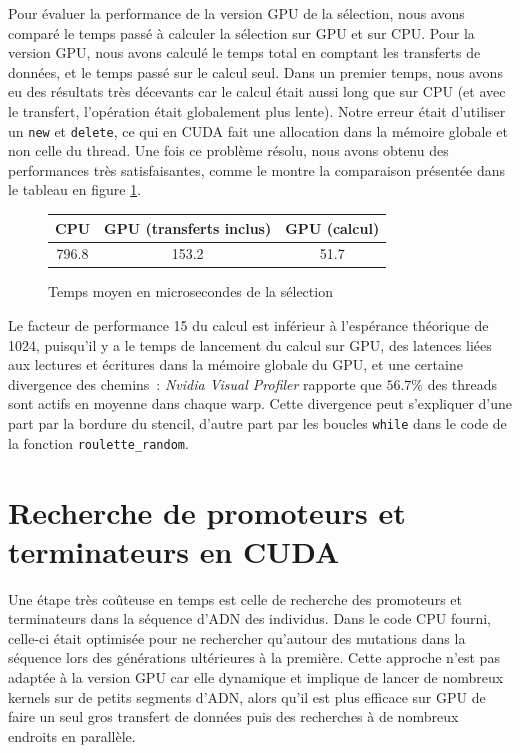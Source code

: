 \documentclass{article}
\begin{document}
Pour évaluer la performance de la version GPU de la sélection, nous avons comparé le temps passé à calculer la sélection sur GPU et sur CPU. Pour la version GPU, nous avons calculé le temps total en comptant les transferts de données, et le temps passé sur le calcul seul. Dans un premier temps, nous avons eu des résultats très décevants car le calcul était aussi long que sur CPU (et avec le transfert, l'opération était globalement plus lente). Notre erreur était d'utiliser un \texttt{new} et \texttt{delete}, ce qui en CUDA fait une allocation dans la mémoire globale et non celle du thread. Une fois ce problème résolu, nous avons obtenu des performances très satisfaisantes, comme le montre la comparaison présentée dans le tableau en figure \ref{fig:selection_comp}.

\begin{figure}[H]
\centering
\begin{tabular}{|c|c|c|}
    \hline
    CPU & GPU (transferts inclus) & GPU (calcul) \\
    \hline
    796.8 & 153.2 & 51.7 \\
    \hline
\end{tabular}
\caption{Temps moyen en microsecondes de la sélection}
\label{fig:selection_comp}
\end{figure}

Le facteur de performance 15 du calcul est inférieur à l'espérance théorique de 1024, puisqu'il y a le temps de lancement du calcul sur GPU, des latences liées aux lectures et écritures dans la mémoire globale du GPU, et une certaine divergence des chemins~: \textit{Nvidia Visual Profiler} rapporte que $56.7\%$ des threads sont actifs en moyenne dans chaque warp. Cette divergence peut s'expliquer d'une part par la bordure du stencil, d'autre part par les boucles \texttt{while} dans le code de la fonction \verb|roulette_random|.

\section{Recherche de promoteurs et terminateurs en CUDA}

Une étape très coûteuse en temps est celle de recherche des promoteurs et terminateurs dans la séquence d'ADN des individus. Dans le code CPU fourni, celle-ci était optimisée pour ne rechercher qu'autour des mutations dans la séquence lors des générations ultérieures à la première. Cette approche n'est pas adaptée à la version GPU car elle dynamique et implique de lancer de nombreux kernels sur de petits segments d'ADN, alors qu'il est plus efficace sur GPU de faire un seul gros transfert de données puis des recherches à de nombreux endroits en parallèle.
\end{document}
